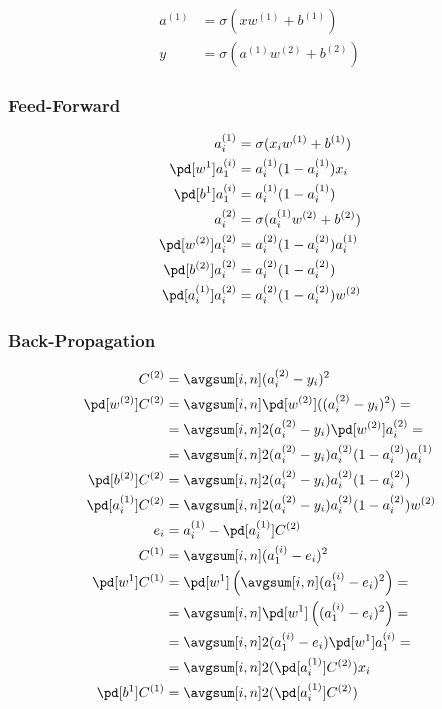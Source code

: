 \documentclass{article}
\begin{document}
\begin{align}
  a^{(1)} &= \sigma(xw^{(1)} + b^{(1)}) \\
  y &= \sigma(a^{(1)}w^{(2)} + b^{(2)})
\end{align}

\subsubsection{Feed-Forward}

\begin{align}
  a_i^{(1)} &= \sigma(x_iw^{(1)} + b^{(1)}) \\
  \pd[w^{1}]a_1^{(i)} &= a_i^{(1)}(1 - a_i^{(1)})x_i \\
  \pd[b^{1}]a_1^{(i)} &= a_i^{(1)}(1 - a_i^{(1)}) \\
  a_i^{(2)} &= \sigma(a_i^{(1)}w^{(2)} + b^{(2)}) \\
  \pd[w^{(2)}]a_i^{(2)} &= a_i^{(2)}(1 - a_i^{(2)})a_i^{(1)} \\
  \pd[b^{(2)}]a_i^{(2)} &= a_i^{(2)}(1 - a_i^{(2)}) \\
  \pd[a_i^{(1)}]a_i^{(2)} &= a_i^{(2)}(1 - a_i^{(2)})w^{(2)}
\end{align}

\subsubsection{Back-Propagation}

\begin{align}
  C^{(2)} &= \avgsum[i, n] (a_i^{(2)} - y_i)^2 \\
  \pd[w^{(2)}] C^{(2)}
            &= \avgsum[i, n] \pd[w^{(2)}]((a_i^{(2)} - y_i)^2) = \\
            &= \avgsum[i, n] 2(a_i^{(2)} - y_i)\pd[w^{(2)}]a_i^{(2)} = \\
            &= \avgsum[i, n] 2(a_i^{(2)} - y_i)a_i^{(2)}(1 - a_i^{(2)})a_i^{(1)} \\
  \pd[b^{(2)}] C^{(2)} &= \avgsum[i, n] 2(a_i^{(2)} - y_i)a_i^{(2)}(1 - a_i^{(2)}) \\
  \pd[a_i^{(1)}]C^{(2)} &= \avgsum[i, n] 2(a_i^{(2)} - y_i)a_i^{(2)}(1 - a_i^{(2)})w^{(2)} \\
  e_i &= a_i^{(1)} - \pd[a_i^{(1)}]C^{(2)} \\
  C^{(1)} &= \avgsum[i, n] (a_1^{(i)} - e_i)^2 \\
  \pd[w^{1}]C^{(1)}
            &= \pd[w^{1}]\left(\avgsum[i, n] (a_1^{(i)} - e_i)^2\right) =\\
            &= \avgsum[i, n] \pd[w^{1}]\left((a_1^{(i)} - e_i)^2\right) =\\
            &= \avgsum[i, n] 2(a_1^{(i)} - e_i)\pd[w^{1}]a_1^{(i)} =\\
            &= \avgsum[i, n] 2(\pd[a_i^{(1)}]C^{(2)})x_i \\
  \pd[b^{1}]C^{(1)} &= \avgsum[i, n] 2(\pd[a_i^{(1)}]C^{(2)})
\end{align}
\end{document}
